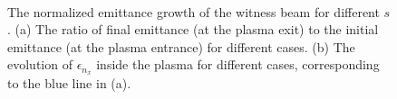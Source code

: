 \documentclass[%
reprint, superscriptaddress,
 amsmath,amssymb, aps,
prstab,
]{revtex4-2}
\begin{document}
\begin{figure} 
    \\
    \caption{The normalized emittance growth of the witness beam for
    different $s$. (a) The ratio of final emittance (at the plasma exit)
    to the initial emittance (at the plasma entrance) for different
    cases. (b) The evolution of $\epsilon_{n_x}$ inside the plasma for
    different cases, corresponding to the blue line in (a).}
    \label{fig:emittance_increment} 
\end{figure}
\end{document}
